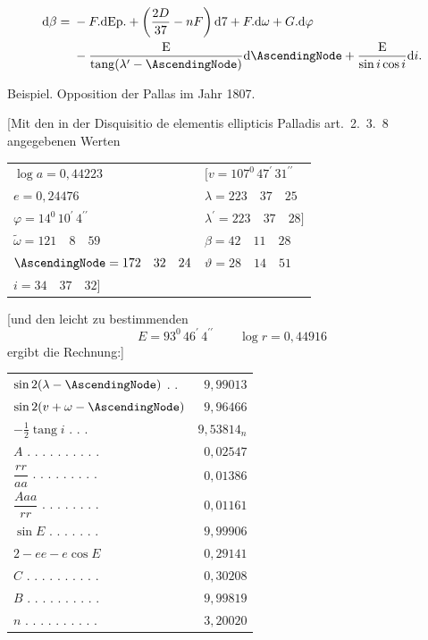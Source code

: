 \[
\begin{aligned}
\mathrm{d}\beta={}&-F\mathord{.}\mathrm{dEp.}+\left(\frac{2D}{3\mathord{7}}-nF\right)\mathrm{d}\mathord{7}+F\mathord{.}\mathrm{d}\omega+G\mathord{.}\mathrm{d}\varphi\\
&-\frac{\mathrm{E}}{\operatorname{tang}(\lambda^{\prime}-\AscendingNode)}\mathrm{d}\AscendingNode
+\frac{\mathrm{E}}{\sin i\cos i}\mathrm{d}i.
\end{aligned}
\]
\begin{center}
Beispiel. Opposition der Pallas im Jahr 1807.
\end{center}
[Mit den in der Disquisitio de elementis ellipticis Palladis \mbox{art. 2. 3. 8} angegebenen Werten
\begin{center}
\begin{tabular}{@{}ll@{}}
\(\log a=0{,}44223\) & \([v=107^{0}\,47^{\prime}\,31^{\prime\prime}\)\\
\(e=0{,}24476\) & \(\lambda=223\quad37\quad25\)\\
\(\varphi=14^{0}\,10^{\prime}\,4^{\prime\prime}\) & \(\lambda^{\prime}=223\quad37\quad28]\)\\
\(\tilde\omega=121\quad8\quad59\) & \(\beta=42\quad11\quad28\)\\
\(\AscendingNode=172\quad32\quad24\) & \(\vartheta=28\quad14\quad51\)\\
\(i=34\quad37\quad32]\) &
\end{tabular}
\end{center}
[und den leicht zu bestimmenden
\[
E=93^{0}\,46^{\prime}\,4^{\prime\prime}\qquad \log r=0{,}44916
\]
ergibt die Rechnung:]
\begin{center}
\renewcommand{\arraystretch}{1.4}
\begin{tabular}{@{}lr@{}}
\(\sin2(\lambda-\AscendingNode)\) . . & \(9{,}99013\)\\
\(\sin2(v+\omega-\AscendingNode)\)  & \(9{,}96466\)\\
\(-\tfrac12\operatorname{tang}i\) . . . & \(9{,}53814_n\)\\
\hline
\(A\) . . . . . . . . . . & \(0{,}02547\)\\
\(\dfrac{rr}{aa}\) . . . . . . . . . & \(0{,}01386\)\\[4pt]
\(\dfrac{Aaa}{rr}\) . . . . . . . . & \(0{,}01161\)\\
\(\sin E\) . . . . . . . & \(9{,}99906\)\\
\(2-ee-e\cos E\)  & \(0{,}29141\)\\
\hline
\(C\) . . . . . . . . . . & \(0{,}30208\)\\
\(B\) . . . . . . . . . . & \(9{,}99819\)\\
\(n\) . . . . . . . . . . & \(3{,}20020\)\\
\end{tabular}
\end{center}
